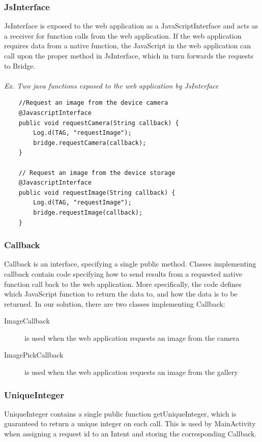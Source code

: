 \subsubsection{JsInterface} \label{subsubsec:jsinterface}
JsInterface is exposed to the web application as a JavaScriptInterface and acts as a receiver for function calls from the web application. If the web application requires data from a native function, the JavaScript in the web application can call upon the proper method in JsInterface, which in turn forwards the requests to Bridge.
\\\\
\emph{Ex. Two java functions exposed to the web application by JsInterface}
\begin{lstlisting}
    //Request an image from the device camera
    @JavascriptInterface
    public void requestCamera(String callback) {
        Log.d(TAG, "requestImage");
        bridge.requestCamera(callback);
    }

    // Request an image from the device storage
    @JavascriptInterface
    public void requestImage(String callback) {
        Log.d(TAG, "requestImage");
        bridge.requestImage(callback);
    }
\end{lstlisting}

	
\subsubsection{Callback} 
Callback is an interface, specifying a single public method. Classes implementing callback contain code specifying how to send results from a requested native function call back to the web application. More specifically, the code defines which JavaScript function to return the data to, and how the data is to be returned. In our solution, there are two classes implementing Callback:
	\begin{description}
		\item[ImageCallback] is used when the web application requests an image from the camera
		
		\item[ImagePickCallback] is used when the web application requests an image from the gallery
	\end{description}
		
\subsubsection{UniqueInteger} 
UniqueInteger contains a single public function getUniqueInteger, which is guaranteed to return a unique integer on each call. This is used by MainActivity when assigning a request id to an Intent and storing the corresponding Callback.

